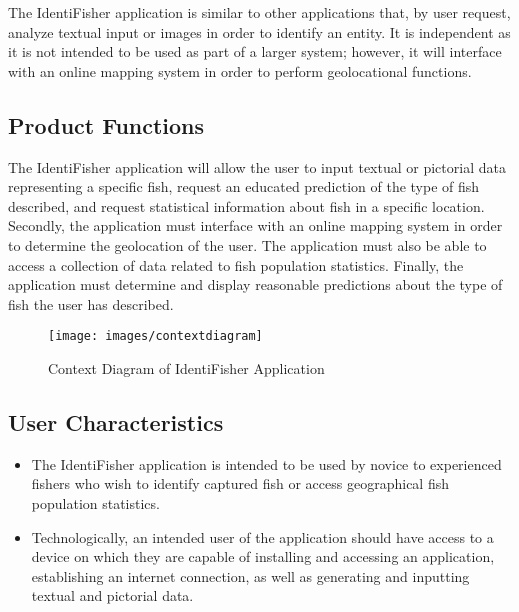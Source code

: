 \documentclass{article}
\begin{document}
The IdentiFisher application is similar to other applications that,
by user request, analyze textual input or images in order to identify
an entity. It is independent as it is not intended to be used as part
of a larger system; however, it will interface with an online mapping
system in order to perform geolocational functions.

\subsection{Product Functions}
The IdentiFisher application will allow the user to input textual or
pictorial data representing a specific fish, request an educated
prediction of the type of fish described, and request statistical
information about fish in a specific location. Secondly, the application
must interface with an online mapping system in order to determine the
geolocation of the user. The application must also be able to access a
collection of data related to fish population statistics. Finally, the
application must determine and display reasonable predictions about
the type of fish the user has described.

\begin{figure}[H]
	\texttt{[image: images/contextdiagram]}
	\caption{Context Diagram of IdentiFisher Application}
\end{figure}


\subsection{User Characteristics}
\begin{itemize}
	\item
	The IdentiFisher application is intended to be used by novice to
	experienced fishers who wish to identify captured fish or access
	geographical fish population statistics.

	\item
	Technologically, an intended user of the application should have
	access to a device on which they are capable of installing and
	accessing an application, establishing an internet connection,
	as well as generating and inputting textual and pictorial data.
\end{itemize}
\end{document}
